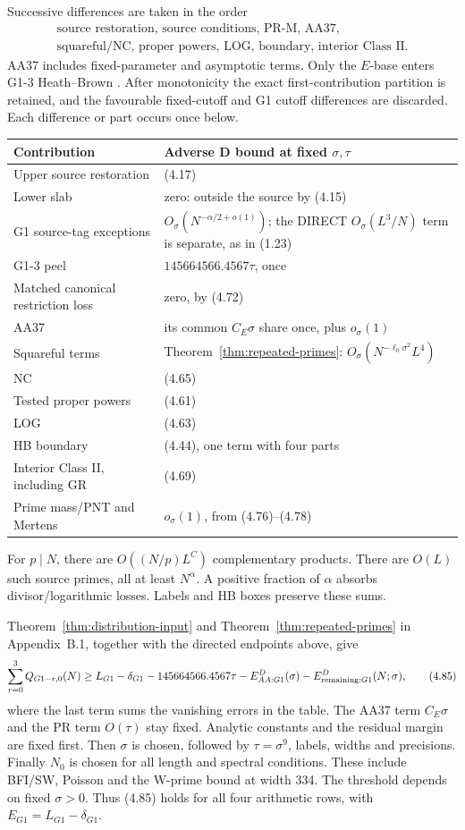 Successive differences are taken in the order
\[
 \begin{gathered}
 \text{source restoration, source conditions, PR-M, AA37,}\\
 \text{squareful/NC, proper powers, LOG, boundary, interior Class II}.
\end{gathered}
\]
AA37 includes fixed-parameter and asymptotic terms.
Only the $E$-base enters G1-3 Heath--Brown \cite{ref6}.
After monotonicity the exact first-contribution partition is retained,
and the favourable fixed-cutoff and G1 cutoff differences are discarded.
Each difference or part occurs once below.
\begingroup
\setlength{\tabcolsep}{3pt}
\begin{longtable}{@{}>{\raggedright\arraybackslash}p{}>{\raggedright\arraybackslash}p{}@{}}
\toprule
Contribution & Adverse D bound at fixed $\sigma,\tau$ \\
\midrule
Upper source restoration & (4.17) \\
Lower slab & zero: outside the source by (4.15) \\
G1 source-tag exceptions & $O_\sigma(N^{-\alpha/2+o(1)})$; the DIRECT $O_\sigma(L^3/N)$ term is separate, as in (1.23) \\
G1-3 peel & $145664566.4567\tau$, once \\
Matched canonical restriction loss & zero, by (4.72) \\
AA37 & its common $C_E\sigma$ share once, plus $o_\sigma(1)$ \\
Squareful terms & Theorem~\ref{thm:repeated-primes}: $O_\sigma(N^{-\ell_0\sigma^2}L^4)$ \\
NC & (4.65) \\
Tested proper powers & (4.61) \\
LOG & (4.63) \\
HB boundary & (4.44), one term with four parts \\
Interior Class II, including GR & (4.69) \\
Prime mass/PNT and Mertens & $o_\sigma(1)$, from (4.76)--(4.78) \\
\bottomrule
\end{longtable}
\endgroup
For $p\mid N$, there are $O((N/p)L^C)$ complementary products.
There are $O(L)$ such source primes, all at least $N^\alpha$.
A positive fraction of $\alpha$ absorbs divisor/logarithmic losses.
Labels and HB boxes preserve these sums.

Theorem~\ref{thm:distribution-input} and Theorem~\ref{thm:repeated-primes} in Appendix~B.1,
together with the directed endpoints above, give
\[
 \sum_{r=0}^3 Q_{G1-r,0}(N)
 \ge L_{G1}-\delta_{G1}-145664566.4567\tau-E^D_{AA:G1}(\sigma)
                    -E^D_{{\rm remaining}:G1}(N;\sigma),
 \tag{4.85}
\]
where the last term sums the vanishing errors in the table.
The AA37 term $C_E\sigma$ and the PR term $O(\tau)$ stay fixed.
Analytic constants and the residual margin are fixed first.
Then $\sigma$ is chosen, followed by $\tau=\sigma^9$, labels, widths and precisions.
Finally $N_0$ is chosen for all length and spectral conditions.
These include BFI/SW, Poisson and the W-prime bound at width 334.
The threshold depends on fixed $\sigma>0$.
Thus (4.85) holds for all four arithmetic rows, with $E_{G1}=L_{G1}-\delta_{G1}$.

